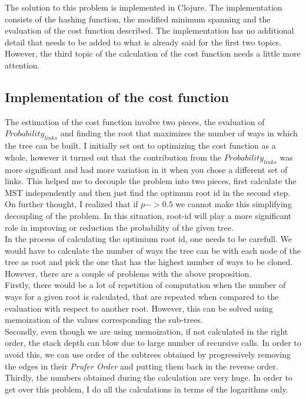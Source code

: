 \documentclass[12pt]{article}
\begin{document}
The solution to this problem is implemented in Clojure. The implementation consists of the hashing function, the modified minimum spanning and the evaluation of the cost function described. The implementation has no additional detail that needs to be added to what is already said for the first two topics. However, the third topic of the calculation of the cost function needs a little more  attention.

\subsection{Implementation of the cost function}
The estimation of the cost function involve two pieces, the evaluation of $Probability_{links}$ and finding the root that maximizes the number of ways in which the tree can be built. I initially set out to optimizing the cost function as a whole, however it turned out that the contribution from the $Probability_{links}$ was more significant and had more variation in it when you chose a different set of links. This helped me to decouple the problem into two pieces, first calculate the MST independently and then just find the optimum root id in the second step. On further thought, I realized that if $p->0.5$ we cannot make this simplifying decoupling of the problem. In this situation, root-id will play a more significant role in improving or reduction the probability of the given tree.\\
In the process of calculating the optimium root id, one needs to be carefull. We would have to calculate the number of ways the tree can be with each node of the tree as root and pick the one that has the highest number of ways to be cloned. However, there are a couple of problems with the above proposition. \\
 Firstly, there would be a lot of repetition of computation when the number of ways for a given root is calculated, that are repeated when compared to the evaluation with respect to another root. However, this can be solved using memoization of the values corresponding the sub-trees. \\
Secondly, even though we are using memoization, if not calculated in the right order, the stack depth can blow due to large number of recursive calls. In order to avoid this, we can use order of the subtrees obtained by progressively removing the edges in their \emph{Prufer Order} and putting them back in the reverse order. \\
 Thirdly, the numbers obtained during the calculation are very huge. In order to get over this problem, I do all the calculations in terms of the logarithms only.
\end{document}
